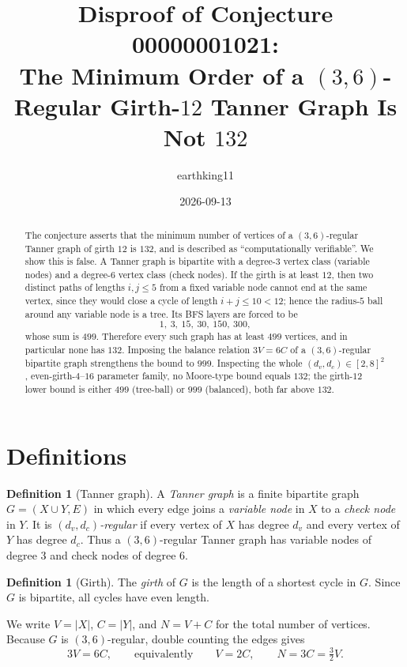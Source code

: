 \documentclass[11pt]{article}
\title{Disproof of Conjecture 00000001021:\\
The Minimum Order of a $(3,6)$-Regular Girth-$12$ Tanner Graph Is Not $132$}
\author{earthking11}
\date{2026-09-13}
\theoremstyle{definition}
\newtheorem{definition}[theorem]{Definition}
\theoremstyle{remark}
\begin{document}
\maketitle

\begin{abstract}
The conjecture asserts that the minimum number of vertices of a
$(3,6)$-regular Tanner graph of girth $12$ is $132$, and is described as
``computationally verifiable''. We show this is false. A Tanner graph is
bipartite with a degree-$3$ vertex class (variable nodes) and a degree-$6$
vertex class (check nodes). If the girth is at least $12$, then two distinct
paths of lengths $i,j\le 5$ from a fixed variable node cannot end at the same
vertex, since they would close a cycle of length $i+j\le 10<12$; hence the
radius-$5$ ball around any variable node is a tree. Its BFS layers are forced
to be
\[
1,\ 3,\ 15,\ 30,\ 150,\ 300,
\]
whose sum is $499$. Therefore every such graph has at least $499$ vertices,
and in particular none has $132$. Imposing the balance relation $3V=6C$ of a
$(3,6)$-regular bipartite graph strengthens the bound to $999$. Inspecting the
whole $(d_v,d_c)\in[2,8]^2$, even-girth-$4$--$16$ parameter family, no
Moore-type bound equals $132$; the girth-$12$ lower bound is either $499$
(tree-ball) or $999$ (balanced), both far above $132$.
\end{abstract}

\section{Definitions}

\begin{definition}[Tanner graph]
A \emph{Tanner graph} is a finite bipartite graph $G=(X\cup Y,E)$ in which
every edge joins a \emph{variable node} in $X$ to a \emph{check node} in $Y$.
It is \emph{$(d_v,d_c)$-regular} if every vertex of $X$ has degree $d_v$ and
every vertex of $Y$ has degree $d_c$. Thus a $(3,6)$-regular Tanner graph has
variable nodes of degree $3$ and check nodes of degree $6$.
\end{definition}

\begin{definition}[Girth]
The \emph{girth} of $G$ is the length of a shortest cycle in $G$. Since $G$ is
bipartite, all cycles have even length.
\end{definition}

We write $V=|X|$, $C=|Y|$, and $N=V+C$ for the total number of vertices.
Because $G$ is $(3,6)$-regular, double counting the edges gives
\begin{equation}\label{eq:balance}
    3V=6C, \qquad\text{equivalently}\qquad V=2C,\qquad N=3C=\tfrac32 V.
\end{equation}
\end{document}
